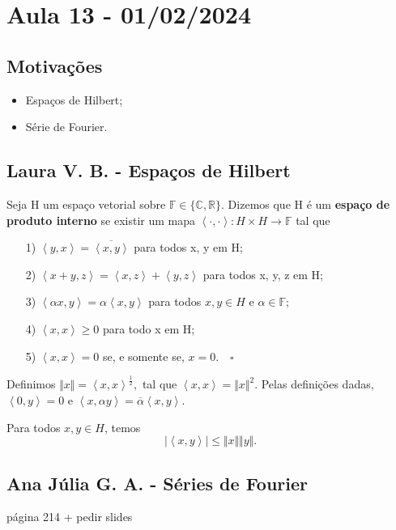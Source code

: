 \documentclass[MeasureTheory/measure_theory.tex]{subfiles}
\begin{document}
\section{Aula 13 - 01/02/2024}
\subsection{Motivações}
\begin{itemize}
	\item Espaços de Hilbert;
	\item Série de Fourier.
\end{itemize}
\subsection{Laura V. B. - Espaços de Hilbert}
\begin{def*}
	Seja H um espaço vetorial sobre \(\mathbb{F}\in\{\mathbb{C}, \mathbb{R}\}\). Dizemos que H é um \textbf{espaço de produto interno} se existir um mapa
	\(\left< \cdot , \cdot  \right>:H \times H\rightarrow \mathbb{F}\) tal que
	\begin{itemize}
		\item[1)] \(\left< y, x \right> = \overline{\left< x, y \right>}\) para todos x, y em H;
		\item[2)] \(\left< x + y, z \right> = \left< x, z \right> + \left< y, z \right>\) para todos x, y, z em H;
		\item[3)] \(\left< \alpha x, y \right> = \alpha \left< x, y \right>\) para todos \(x, y\in H\) e \(\alpha \in \mathbb{F};\)
		\item[4)] \(\left< x, x \right> \geq 0\) para todo x em H;
		\item[5)] \(\left< x, x \right> = 0\) se, e somente se, \(x=0.\quad \square\)
	\end{itemize}
\end{def*}
Definimos \(\Vert x \Vert = \left< x, x \right>^{\frac{1}{2}},\) tal que \(\left< x, x \right> = \Vert x \Vert^{2}.\) Pelas definições dadas, \(\left< 0, y \right> = 0\) e
\(\left< x, \alpha y \right> = \overline{\alpha }\left< x, y \right>.\)

\hypertarget{cauchy_schwarz}{
	\begin{theorem*}
		Para todos \(x, y\in H\), temos
		\[
			|\left< x, y \right>|\leq \Vert x \Vert \Vert y \Vert.
		\]
	\end{theorem*}}

\subsection{Ana Júlia G. A. - Séries de Fourier}
página 214 + pedir slides
\end{document}
